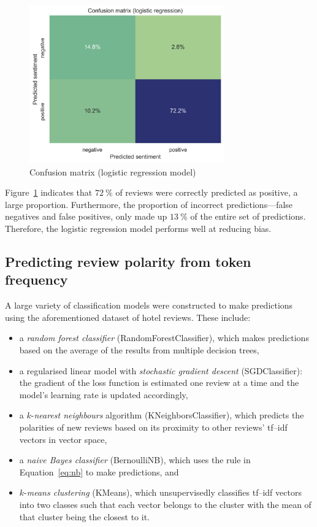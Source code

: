 \documentclass[11pt, a4paper]{pancake-article}
\begin{document}
\begin{figure}
	\begin{center}
		\includegraphics[width=0.75\textwidth]{../results/logistic_confuse.png}
	\end{center}
	\caption{Confusion matrix (logistic regression model)}\label{fig:logistic-confuse}
\end{figure}

Figure~\ref{fig:logistic-confuse} indicates that $\qty{72}{\percent}$ of reviews were correctly predicted as positive, a large proportion.
Furthermore, the proportion of incorrect predictions---false negatives and false positives, only made up
$\qty{13}{\percent}$ of the entire set of predictions. Therefore, the logistic regression model performs
well at reducing bias.

\subsection{Predicting review polarity from token frequency}

A large variety of classification models were constructed to make predictions using the aforementioned
dataset of hotel reviews. These include:

\begin{itemize}
  \item a \textit{random forest classifier} (RandomForestClassifier), which makes predictions based on the average of the results from multiple decision trees,
  \item a regularised linear model with \textit{stochastic gradient descent} (SGDClassifier): the gradient of the loss function is estimated one review at a time and the model's learning rate is updated accordingly,
  \item a $k$-\textit{nearest neighbours} algorithm (KNeighborsClassifier), which predicts the polarities of new reviews based on its proximity to other reviews' tf--idf vectors in vector space,
  \item a \textit{naive Bayes classifier} (BernoulliNB), which uses the rule in Equation~\ref{eq:nb} to make predictions, and
  \item $k$-\textit{means clustering} (KMeans), which unsupervisedly classifies tf--idf vectors into two classes such that each vector belongs to the cluster with the mean of that cluster being the closest to it.
\end{itemize}
\end{document}

